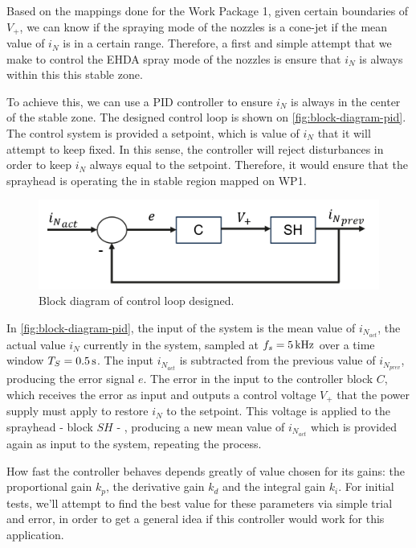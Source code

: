 \documentclass[oneside,12pt]{article}
\begin{document}
Based on the mappings done for the Work Package 1, given certain boundaries of $V_+$, we can know if the spraying mode of the nozzles
is a cone-jet if the mean value of $i_N$ is in a certain range. Therefore, a first and simple attempt that we make to control the EHDA
spray mode of the nozzles is ensure that $i_N$ is always within this this stable zone.

To achieve this, we can use a PID controller to ensure $i_N$ is always in the center of the stable zone. The designed control loop 
is shown on \autoref{fig:block-diagram-pid}. The control system is provided a setpoint, which is value of $i_N$ that it will attempt
to keep fixed. In this sense, the controller will reject disturbances in order to keep $i_N$ always equal to the setpoint.
Therefore, it would ensure that the sprayhead is operating the in stable region mapped on WP1. 

\begin{figure}[h!]
    \centering
    \includegraphics[width=.8\textwidth,trim=1 1 1 1,clip]{figures/block-diagram-pid.png}
    \caption{Block diagram of control loop designed.}
    \label{fig:block-diagram-pid}
\end{figure}

In \autoref{fig:block-diagram-pid}, the input of the system is the mean value of $i_{N_{act}}$, the actual value $i_N$ currently
in the system, sampled at $f_s = 5 \,\mathrm{kHz}$ over a time window
$T_S = 0.5 \,\mathrm{s}$. The input $i_{N_{act}}$ is subtracted from the previous value of $i_{N_{prev}}$, producing the error signal $e$. 
The error in the input to the controller block $C$, which receives the error as input and outputs a control voltage $V_+$ that the 
power supply must apply to restore $i_N$ to the setpoint. This voltage is applied to the sprayhead - block $SH$ - , producing a new mean value 
of $i_{N_{act}}$ which is provided again as input to the system, repeating the process.

How fast the controller behaves depends greatly of value chosen for its gains: the proportional gain $k_p$, the derivative gain $k_d$
and the integral gain $k_i$. For initial tests, we'll attempt to find the best value for these parameters via simple trial and error,
in order to get a general idea if this controller would work for this application. 
\end{document}
